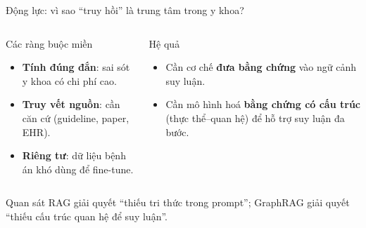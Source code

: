 \documentclass[aspectratio=169,10pt]{beamer}
\begin{document}
\begin{frame}{Động lực: vì sao ``truy hồi'' là trung tâm trong y khoa?}
\small
\begin{columns}[T,onlytextwidth]
\begin{block}{Các ràng buộc miền}
\begin{itemize}
  \item \textbf{Tính đúng đắn}: sai sót y khoa có chi phí cao.
  \item \textbf{Truy vết nguồn}: cần căn cứ (guideline, paper, EHR).
  \item \textbf{Riêng tư}: dữ liệu bệnh án khó dùng để fine-tune.
\end{itemize}
\end{block}

\begin{block}{Hệ quả}
\begin{itemize}
  \item Cần cơ chế \textbf{đưa bằng chứng} vào ngữ cảnh suy luận.
  \item Cần mô hình hoá \textbf{bằng chứng có cấu trúc} (thực thể--quan hệ) để hỗ trợ suy luận đa bước.
\end{itemize}
\end{block}
\end{columns}

\vspace{0.2cm}
\begin{block}{Quan sát}
RAG giải quyết ``thiếu tri thức trong prompt''; GraphRAG giải quyết ``thiếu cấu trúc quan hệ để suy luận''.
\end{block}
\end{frame}
\end{document}
